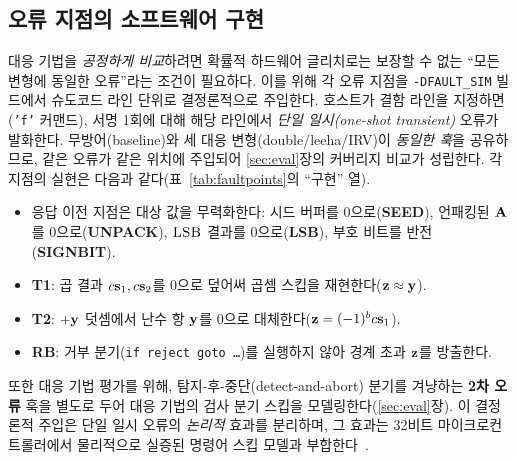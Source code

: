 \subsection{오류 지점의 소프트웨어 구현}
\label{subsec:fault-impl}
대응 기법을 \emph{공정하게 비교}하려면 확률적 하드웨어 글리치로는 보장할 수 없는 ``모든 변형에 동일한
오류''라는 조건이 필요하다. 이를 위해 각 오류 지점을 \texttt{-DFAULT\_SIM} 빌드에서 슈도코드 라인 단위로
결정론적으로 주입한다. 호스트가 결함 라인을 지정하면(\texttt{'f'} 커맨드), 서명 1회에 대해 해당 라인에서
\emph{단일 일시(one-shot transient)} 오류가 발화한다. 무방어(\textsf{baseline})와 세 대응
변형(\textsf{double}/\textsf{leeha}/\textsf{IRV})이 \emph{동일한 훅}을 공유하므로, 같은 오류가 같은 위치에
주입되어 \ref{sec:eval}장의 커버리지 비교가 성립한다. 각 지점의 실현은 다음과 같다(표~\ref{tab:faultpoints}의
``구현'' 열).
\begin{itemize}
  \item 응답 이전 지점은 대상 값을 무력화한다: 시드 버퍼를 0으로(\textbf{SEED}), 언패킹된 $\mathbf{A}$를
        0으로(\textbf{UNPACK}), $\textsc{LSB}$ 결과를 0으로(\textbf{LSB}), 부호 비트를 반전(\textbf{SIGNBIT}).
  \item \textbf{T1}: 곱 결과 $c\mathbf{s}_1,c\mathbf{s}_2$를 0으로 덮어써 곱셈 스킵을 재현한다($\mathbf{z}\approx\mathbf{y}$).
  \item \textbf{T2}: $+\mathbf{y}$ 덧셈에서 난수 항 $\mathbf{y}$를 0으로 대체한다($\mathbf{z}=(-1)^b c\mathbf{s}_1$).
  \item \textbf{RB}: 거부 분기(\texttt{if reject goto \dots})를 실행하지 않아 경계 초과 $\mathbf{z}$를 방출한다.
\end{itemize}
또한 대응 기법 평가를 위해, 탐지-후-중단(detect-and-abort) 분기를 겨냥하는 \textbf{2차 오류} 훅을 별도로
두어 대응 기법의 검사 분기 스킵을 모델링한다(\ref{sec:eval}장). 이 결정론적 주입은 단일 일시 오류의
\emph{논리적} 효과를 분리하며, 그 효과는 32비트 마이크로컨트롤러에서 물리적으로 실증된 명령어 스킵
모델과 부합한다~\cite{moro2013}.

